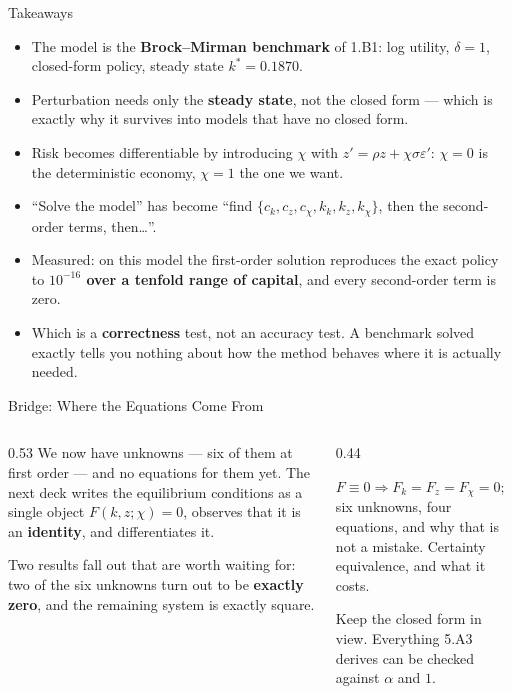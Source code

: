 \begin{frame}{Takeaways}
\begin{takeawaybox}
\begin{itemize}\small
  \item The model is the \textbf{Brock--Mirman benchmark} of 1.B1: log utility, $\delta=1$, closed-form policy, steady state $k^{*}=0.1870$.
  \item Perturbation needs only the \textbf{steady state}, not the closed form --- which is exactly why it survives into models that have no closed form.
  \item Risk becomes differentiable by introducing $\chi$ with $z'=\rho z+\chi\sigma\varepsilon'$: $\chi=0$ is the deterministic economy, $\chi=1$ the one we want.
  \item ``Solve the model'' has become ``find $\{c_k,c_z,c_\chi,k_k,k_z,k_\chi\}$, then the second-order terms, then\dots''.
  \item Measured: on this model the first-order solution reproduces the exact policy to \textbf{$10^{-16}$ over a tenfold range of capital}, and every second-order term is zero.
  \item Which is a \textbf{correctness} test, not an accuracy test. A benchmark solved exactly tells you nothing about how the method behaves where it is actually needed.
\end{itemize}
\end{takeawaybox}
\end{frame}

\begin{frame}{Bridge: Where the Equations Come From}
\begin{columns}[T]
\begin{column}{0.53\textwidth}
\small
We now have unknowns --- six of them at first order --- and no equations for them yet. The next deck writes the equilibrium conditions as a single object $F(k,z;\chi)=0$, observes that it is an \textbf{identity}, and differentiates it.
\medskip

Two results fall out that are worth waiting for: two of the six unknowns turn out to be \textbf{exactly zero}, and the remaining system is exactly square.
\end{column}
\begin{column}{0.44\textwidth}
\begin{conceptbox}[title=\textbf{Next (5.A3)}]\small
$F\equiv 0 \Rightarrow F_k=F_z=F_\chi=0$; six unknowns, four equations, and why that is not a mistake. Certainty equivalence, and what it costs.
\end{conceptbox}
\medskip
\begin{examplebox}\footnotesize
Keep the closed form in view. Everything 5.A3 derives can be checked against $\alpha$ and $1$.
\end{examplebox}
\end{column}
\end{columns}
\end{frame}


